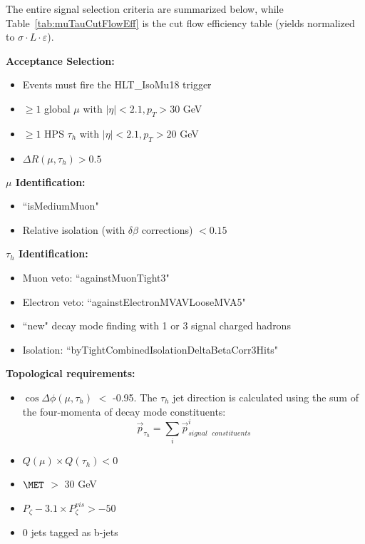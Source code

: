 The entire signal selection criteria are summarized below, while Table~\ref{tab:muTauCutFlowEff} is the cut flow efficiency table (yields normalized to $\sigma 
\cdot L \cdot \varepsilon$).

\textbf{Acceptance Selection:}

\begin{itemize}
  \item Events must fire the HLT{\_}IsoMu18 trigger
  \item $\ge 1$ global $\mu$ with $|\eta| < 2.1, p_{T} > 30$ GeV
  \item $\ge 1$ HPS $\tau_{h}$ with $|\eta| < 2.1, p_{T} > 20$ GeV
  \item $\Delta R(\mu,\tau_{h}) > 0.5$
\end{itemize}

\textbf{$\mu$ Identification:}

\begin{itemize}
  \item ``isMediumMuon"
  \item Relative isolation (with $\delta\beta$ corrections) $< 0.15$
\end{itemize}

\textbf{$\tau_{h}$ Identification:}

\begin{itemize}
  \item Muon veto: ``againstMuonTight3"
  \item Electron veto: ``againstElectronMVAVLooseMVA5"
  \item ``new" decay mode finding with 1 or 3 signal charged hadrons
  \item Isolation: ``byTightCombinedIsolationDeltaBetaCorr3Hits"
\end{itemize}

\textbf{Topological requirements:}

\begin{itemize}
  \item $\cos \Delta \phi (\mu,\tau_{h})$ $<$ -0.95. The $\tau_{h}$ jet direction is calculated using the sum of the four-momenta of decay mode constituents:
\begin{equation}
   \overrightarrow{p}_{\tau_{h}} = \sum_{i} \overrightarrow{p}_{signal\mbox{ }constituents}^{i}
   \label{eq:taudirection}
\end{equation}
  \item $Q(\mu) \times Q(\tau_{h}) < 0 $
  \item $\MET$ $>$ 30 GeV
  \item $P_{\zeta}- 3.1 \times P_{\zeta}^{vis} > -50$
  \item 0 jets tagged as b-jets
\end{itemize}

